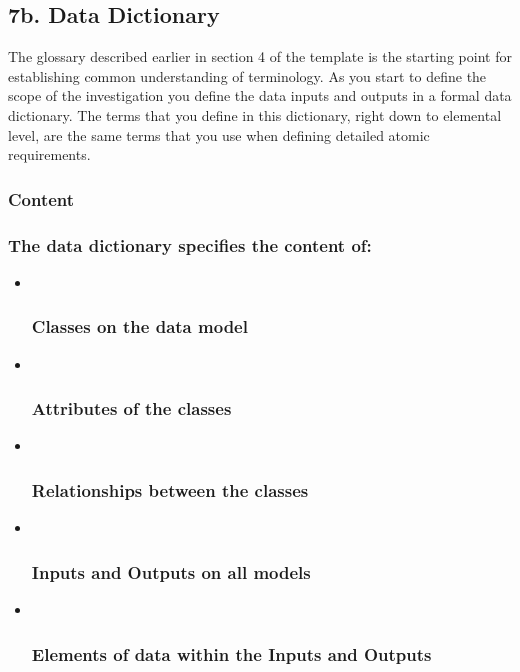 \documentclass[
]{article}
\begin{document}
\hypertarget{b.-data-dictionary}{%
\subsection{7b. Data Dictionary}\label{b.-data-dictionary}}

The glossary described earlier in section 4 of the template is the
starting point for establishing common understanding of terminology. As
you start to define the scope of the investigation you define the data
inputs and outputs in a formal data dictionary. The terms that you
define in this dictionary, right down to elemental level, are the same
terms that you use when defining detailed atomic requirements.

\hypertarget{content-27}{%
\subsubsection{Content}\label{content-27}}

\hypertarget{the-data-dictionary-specifies-the-content-of}{%
\subsubsection{The data dictionary specifies the content
of:}\label{the-data-dictionary-specifies-the-content-of}}

\begin{itemize}
\item ~
  \hypertarget{classes-on-the-data-model}{%
  \subsubsection{Classes on the data
  model}\label{classes-on-the-data-model}}
\item ~
  \hypertarget{attributes-of-the-classes}{%
  \subsubsection{Attributes of the
  classes}\label{attributes-of-the-classes}}
\item ~
  \hypertarget{relationships-between-the-classes}{%
  \subsubsection{Relationships between the
  classes}\label{relationships-between-the-classes}}
\item ~
  \hypertarget{inputs-and-outputs-on-all-models}{%
  \subsubsection{Inputs and Outputs on all
  models}\label{inputs-and-outputs-on-all-models}}
\item ~
  \hypertarget{elements-of-data-within-the-inputs-and-outputs}{%
  \subsubsection{Elements of data within the Inputs and
  Outputs}\label{elements-of-data-within-the-inputs-and-outputs}}
\end{itemize}
\end{document}
